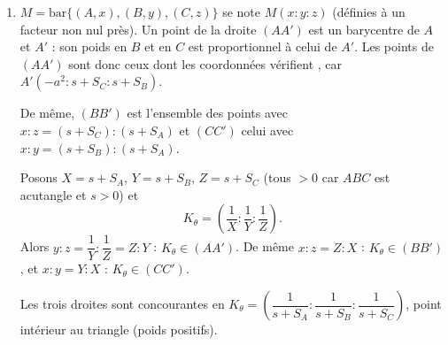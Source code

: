 \begin{enumerate}[itemsep=14pt]
\begin{enumerate}[itemsep=8pt]
    Avec $\overrightarrow{u}=\overrightarrow{AB}$, $\overrightarrow{v}=\overrightarrow{AC}$ ($D=S$) et $\overrightarrow{BC}=\overrightarrow{v}-\overrightarrow{u}$, d'après $(\ast)$ :
    \[J\left(\overrightarrow{BC}\right)=\dfrac{(S_A-c^2)\overrightarrow{v}-(b^2-S_A)\overrightarrow{u}}{S}=\dfrac{-S_B\overrightarrow{v}-S_C\overrightarrow{u}}{S}.\]
    Donc $\overrightarrow{MA'}=\dfrac{t}{2S}\left(S_C\overrightarrow{u}+S_B\overrightarrow{v}\right)$. Comme $\overrightarrow{AM}=\dfrac12(\overrightarrow{u}+\overrightarrow{v})=\dfrac{ts}{2S}(\overrightarrow{u}+\overrightarrow{v})$ :
    \[\overrightarrow{AA'}=\dfrac{t}{2S}\Big[(s+S_C)\overrightarrow{AB}+(s+S_B)\overrightarrow{AC}\Big].\]
    Le coefficient de $A$ dans la combinaison barycentrique est
    \[1-\dfrac{t}{2S}(2s+S_B+S_C)=1-\dfrac{2S+ta^2}{2S}=-\dfrac{t}{2S}a^2.\]
    Divisons les trois poids par $\dfrac t{2S}>0$ : \textbf{$A'=\text{bar}\{(A,-a^2),(B,s+S_C),(C,s+S_B)\}$} (somme des poids $2s\neq0$).

    Par permutation circulaire $(A,B,C)\to(B,C,A)$ :
    \[\begin{aligned}B'&=\text{bar}\{(B,-b^2),(C,s+S_A),(A,s+S_C)\},\\ C'&=\text{bar}\{(C,-c^2),(A,s+S_B),(B,s+S_A)\}.\end{aligned}\]
  \end{enumerate}

  \item\leavevmode
  \begin{prop}
  $M=\text{bar}\{(A,x),(B,y),(C,z)\}$ se note $M(x:y:z)$ (définies à un facteur non nul près).
  Un point de la droite $(AA')$ est un barycentre de $A$ et $A'$ : son poids en $B$ et en $C$ est proportionnel à celui de $A'$. Les points de $(AA')$ sont donc ceux dont les coordonnées vérifient , car $A'(-a^2:s+S_C:s+S_B)$.
  \end{prop}
  De même, $(BB')$ est l'ensemble des points avec $x:z=(s+S_C):(s+S_A)$ et $(CC')$ celui avec $x:y=(s+S_B):(s+S_A)$.

  Posons $X=s+S_A$, $Y=s+S_B$, $Z=s+S_C$ (tous $>0$ car $ABC$ est acutangle et $s>0$) et
  \[K_\theta=\left(\dfrac1X:\dfrac1Y:\dfrac1Z\right).\]
  Alors $y:z=\dfrac1Y:\dfrac1Z=Z:Y$ : $K_\theta\in(AA')$. De même $x:z=Z:X$ : $K_\theta\in(BB')$, et $x:y=Y:X$ : $K_\theta\in(CC')$.

  Les trois droites sont concourantes en \textbf{$K_\theta=\left(\dfrac1{s+S_A}:\dfrac1{s+S_B}:\dfrac1{s+S_C}\right)$}, point intérieur au triangle (poids positifs).


\end{enumerate}

